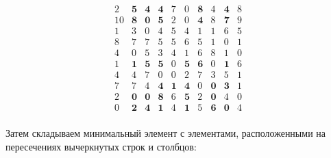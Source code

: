 \documentclass[17pt]{extarticle}
\begin{document}
\[
    \begin{array}{*{10}{c}}
        2  & \textbf{5} & \textbf{4} & \textbf{4} & 7          & 0          & \textbf{8} & 4          & \textbf{4} & 8 \\
        10 & \textbf{8} & \textbf{0} & \textbf{5} & 2          & 0          & \textbf{4} & 8          & \textbf{7} & 9 \\
        1  & 3          & 0          & 4          & 5          & 4          & 1          & 1          & 6          & 5 \\
        8  & 7          & 7          & 5          & 5          & 6          & 5          & 1          & 0          & 1 \\
        4  & 0          & 5          & 3          & 4          & 1          & 6          & 8          & 1          & 0 \\
        1  & \textbf{1} & \textbf{5} & \textbf{5} & 0          & \textbf{5} & \textbf{6} & 0          & \textbf{1} & 6 \\
        4  & 4          & 7          & 0          & 0          & 2          & 7          & 3          & 5          & 1 \\
        7  & 7          & 4          & \textbf{4} & \textbf{1} & \textbf{4} & 0          & \textbf{0} & \textbf{3} & 1 \\
        2  & \textbf{0} & \textbf{0} & \textbf{8} & 6          & \textbf{5} & 2          & \textbf{0} & 4          & 0 \\
        0  & \textbf{2} & \textbf{4} & \textbf{1} & 4          & \textbf{1} & 5          & \textbf{6} & \textbf{0} & 4 \\
    \end{array}
\]

Затем складываем минимальный элемент с элементами, расположенными на пересечениях вычеркнутых строк и столбцов:
\end{document}
